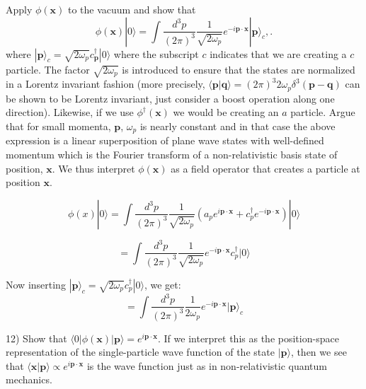 \documentclass[working, oneside]{../../Preambles/tuftebook}
\begin{document}
\begin{exercise}[2.11]
Apply $\phi(\mathbf{x})$ to the vacuum and show that
\[
\phi(\mathbf{x}) |0\rangle = \int \frac{d^3p}{(2\pi)^3} \frac{1}{\sqrt{2\omega_p}} e^{-i\mathbf{p}\cdot\mathbf{x}} |\mathbf{p}\rangle_c, \tag{29}
.\] 
where $|\mathbf{p}\rangle_c = \sqrt{2\omega_p} c^\dagger_{\mathbf{p}} |0\rangle$ where the subscript $c$ indicates that we are creating a $c$ particle. The factor $\sqrt{2\omega_p}$ is introduced to ensure that the states are normalized in a Lorentz invariant fashion (more precisely, $\langle \mathbf{p}|\mathbf{q} \rangle = (2\pi)^3 2\omega_p \delta^3(\mathbf{p} - \mathbf{q})$ can be shown to be Lorentz invariant, just consider a boost operation along one direction). Likewise, if we use $\phi^\dagger(\mathbf{x})$ we would be creating an $a$ particle. Argue that for small momenta, $\mathbf{p}$, $\omega_p$ is nearly constant and in that case the above expression is a linear superposition of plane wave states with well-defined momentum which is the Fourier transform of a non-relativistic basis state of position, $\mathbf{x}$. We thus interpret $\phi(\mathbf{x})$ as a field operator that creates a particle at position $\mathbf{x}$.
\end{exercise}
\begin{solution}
\[
\phi(x) | 0 \rangle = \int \frac{d^3p}{(2\pi)^3} \frac{1}{\sqrt{2\omega_p}} 
\left( a_p e^{i\mathbf{p} \cdot \mathbf{x}} + c_p^\dagger e^{-i\mathbf{p} \cdot \mathbf{x}} \right) | 0 \rangle
\]

\[
= \int \frac{d^3p}{(2\pi)^3} \frac{1}{\sqrt{2\omega_p}} e^{-i\mathbf{p} \cdot \mathbf{x}} c_p^\dagger | 0 \rangle
\]

Now inserting \(| \mathbf{p} \rangle_c = \sqrt{2\omega_p} c_p^\dagger | 0 \rangle\), we get:
\[
= \int \frac{d^3p}{(2\pi)^3} \frac{1}{2\omega_p} e^{-i\mathbf{p} \cdot \mathbf{x}} | \mathbf{p} \rangle_c
\]
\end{solution}
\begin{exercise}[2.12]
12) Show that $\langle 0| \phi(\mathbf{x}) |\mathbf{p}\rangle = e^{i\mathbf{p}\cdot\mathbf{x}}$. If we interpret this as the position-space representation of the single-particle wave function of the state $|\mathbf{p}\rangle$, then we see that $\langle \mathbf{x}|\mathbf{p}\rangle \propto e^{i\mathbf{p}\cdot\mathbf{x}}$ is the wave function just as in non-relativistic quantum mechanics.
\end{exercise}
\end{document}
